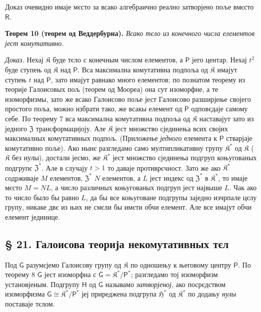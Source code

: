 \documentclass[11pt]{article}
\begin{document}
Доказ очевидно имаје мєсто за всако алгебраично реално затворјено поље вмєсто \(\mathsf{R}\).

\textbf{Теорем 10 (теорем од Веддербурна).} \emph{Всако тєло из конечного числа елементов јест комутативно.}

\emph{Доказ.} Нехај \(\mathfrak K\) буде тєло с конечным числом елементов, а \(\mathsf P\) јего центар. Нехај \(t^2\) буде ступењ од \(\mathfrak K\) над \(\mathsf P\). Вса максимална комутативна подпоља од \(\mathfrak K\) имајут ступењ \(t\) над \(\mathsf P\), зато имајут равнако много елементов; по познатом теорему из теорије Галоисовых пољ (теорем од Моореа) она сут изоморфне, а те изоморфизмы, зато же всако Галоисово поље јест Галоисово разширјење својего простого поља, можно избрати тако, же всакы елемент од \(\mathsf P\) одповєдаје самому себе. По теорему 7 вса максимална комутативна подпоља од \(\mathfrak K\) наставајут зато из једного \(\mathfrak Z\) трансформацијоју. Але \(\mathfrak K\) јест множство сјединења всих својих максималных комутативных подпољ. (Приложење \emph{једного} елемента к \(\mathsf P\) стварјаје комутативно поље). Ако нынє разгледамо само мултипликативну групу \(\mathfrak K^*\) од \(\mathfrak K\) (\(\mathfrak K\) без нулы), достали јесмо, же \(\mathfrak K^*\) јест множство сјединења подгруп коњугованых подгрупє \(\mathfrak Z^*\). Але в случају \(t>1\) то даваје противрєчност. Зато же ако \(\mathfrak K^*\) содрживаје \(M\) елементов, \(\mathfrak Z^*\) \(N\) елементов, а \(L\) јест индекс од \(\mathfrak Z^*\) в \(\mathfrak K^*\), то имаје мєсто \(M=NL\), а число различных коњугованых подгруп јест највыше \(L\). Чак ако то число было бы равно \(L\), да бы все коњуговане подгрупы заједно изчрпале цєлу групу, никаке двє из њих не смєли бы имєти обчи елемент. Але все имајут обчи елемент јединице.

\subsection*{§ 21. Галоисова теорија некомутативных тєл}\label{die-galoissche-theorie-der-nichtkommutativen-koerper}

Под \(\mathsf{G}\) разумєјемо Галоисову групу од \(\mathfrak K\) по одношењу к његовому центру \(\mathsf P\). По теорему 8 \(\mathsf{G}\) јест изоморфна с \(\overline{\mathsf G}=\mathfrak K^*/\mathsf P^*\); разгледамо тој изоморфизм установјеным. Подгрупу \(\mathsf{H}\) од \(\mathsf{G}\) называмо \emph{затворјеној}, ако посрєдством изоморфизма \(\mathsf{G}\cong\mathfrak K^*/\mathsf P^*\) јеј приреджена подгрупа \(\mathfrak H^*\) од \(\mathfrak K^*\) по додању \emph{нулы} поставаје тєлом.
\end{document}
